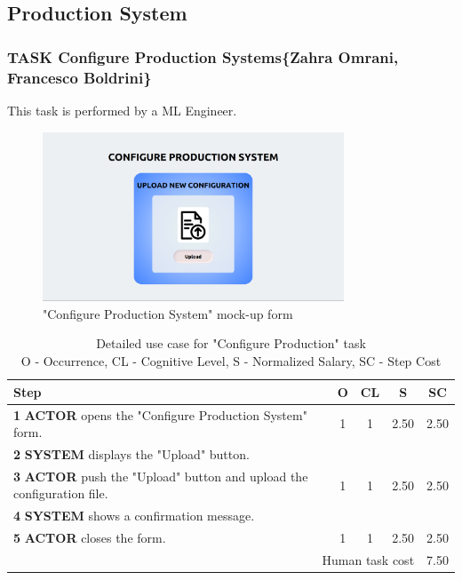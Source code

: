 \subsection{Production System}

\subsubsection{TASK Configure Production Systems\{Zahra Omrani, Francesco Boldrini\}}
This task is performed by a ML Engineer.

\begin{figure}[H]
\centering
\includegraphics[width=0.8\textwidth]{figures/ui_configure_production.png}
\caption{"Configure Production System" mock-up form}
\end{figure}

\begin{table}[H]
\centering
\begin{tabularx}{\textwidth}{|X|c|c|c|c|}
\hline
\textbf{Step} & \textbf{O} & \textbf{CL} & \textbf{S} & \textbf{SC} \\
\hline
\textbf{1} \textbf{ACTOR} opens the "Configure Production System" form. & 1 & 1 & 2.50 & 2.50 \\
\hline
\textbf{2} \textbf{SYSTEM} displays the "Upload" button.& & & & \\
\hline
\textbf{3} \textbf{ACTOR} push the "Upload" button and upload the configuration file. & 1 & 1 & 2.50 & 2.50 \\
\hline
\textbf{4} \textbf{SYSTEM} shows a confirmation message. & & & & \\
\hline
\textbf{5} \textbf{ACTOR} closes the form. & 1 & 1 & 2.50 & 2.50 \\
\hline
\multicolumn{4}{|r|}{Human task cost} & 7.50 \\
\hline
\end{tabularx}
\caption{Detailed use case for "Configure Production" task\\ 
O - Occurrence, CL - Cognitive Level, S - Normalized Salary, SC - Step Cost}
\label{table:configure_production_system}
\end{table}



